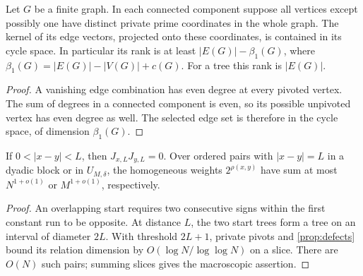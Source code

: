\begin{lemma}\label{lem:private-tree}
Let $G$ be a finite graph. In each connected component suppose all vertices
except possibly one have distinct private prime coordinates in the whole
graph. The kernel of its edge vectors, projected onto these coordinates,
is contained in its cycle space. In particular its rank is at least
$|E(G)|-\beta_1(G)$, where $\beta_1(G)=|E(G)|-|V(G)|+c(G)$.
For a tree this rank is $|E(G)|$.
\end{lemma}
\begin{proof}
A vanishing edge combination has even degree at every pivoted vertex.
The sum of degrees in a connected component is even, so its possible
unpivoted vertex has even degree as well. The selected edge set is therefore
in the cycle space, of dimension $\beta_1(G)$.
\end{proof}

\begin{lemma}\label{lem:local-pairs}
If $0<|x-y|<L$, then $J_{x,L}J_{y,L}=0$. Over ordered pairs with
$|x-y|=L$ in a dyadic block or in $U_{M,\delta}$, the homogeneous weights
$2^{\rho(x,y)}$ have sum at most $N^{1+o(1)}$ or $M^{1+o(1)}$, respectively.
\end{lemma}
\begin{proof}
An overlapping start requires two consecutive signs within the first
constant run to be opposite. At distance $L$, the two start trees form a
tree on an interval of diameter $2L$. With threshold $2L+1$, private
pivots and \cref{prop:defects} bound its relation dimension by
$O(\log N/\log\log N)$ on a slice. There are $O(N)$ such pairs;
summing slices gives the macroscopic assertion.
\end{proof}
